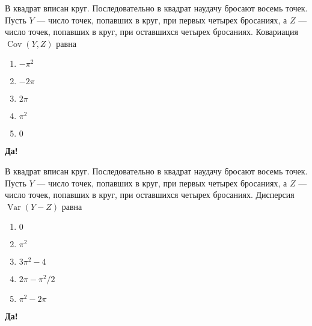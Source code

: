 \documentclass[t]{beamer}
\DeclareMathOperator{\Var}{Var}
\DeclareMathOperator{\Cov}{Cov}
\begin{document}
 \begin{frame} \label{10-Yes} 
\begin{block}{10} 

В квадрат вписан круг. Последовательно в квадрат наудачу бросают восемь точек. Пусть $Y$ — число точек, попавших в круг, при первых четырех бросаниях, а $Z$ — число точек, попавших в круг, при оставшихся четырех бросаниях. Ковариация $\Cov(Y,Z)$ равна
     


 \end{block} 
\begin{enumerate} 
\item[] \hyperlink{10-No}{\beamergotobutton{} $-\pi^2$}
\item[] \hyperlink{10-No}{\beamergotobutton{} $-2\pi$
}
\item[] \hyperlink{10-No}{\beamergotobutton{} $2\pi$}
\item[] \hyperlink{10-No}{\beamergotobutton{} $\pi^2$}
\item[] \hyperlink{10-Yes}{\beamergotobutton{} $0$}
\end{enumerate} 

 \textbf{Да!} 
 \hyperlink{11}{}\end{frame} 


 \begin{frame} \label{11-Yes} 
\begin{block}{11} 

В квадрат вписан круг. Последовательно в квадрат наудачу бросают восемь точек. Пусть $Y$ — число точек, попавших в круг, при первых четырех бросаниях, а $Z$ — число точек, попавших в круг, при оставшихся четырех бросаниях. Дисперсия $\Var(Y - Z)$ равна
 


 \end{block} 
\begin{enumerate} 
\item[] \hyperlink{11-No}{\beamergotobutton{}  $0$
}
\item[] \hyperlink{11-No}{\beamergotobutton{} $\pi^2$}
\item[] \hyperlink{11-No}{\beamergotobutton{} $3\pi^2 - 4$}
\item[] \hyperlink{11-Yes}{\beamergotobutton{} $2\pi - \pi^2 / 2$}
\item[] \hyperlink{11-No}{\beamergotobutton{} $\pi^2 - 2 \pi$}
\end{enumerate} 

 \textbf{Да!} 
 \hyperlink{12}{}\end{frame} 
\end{document}

